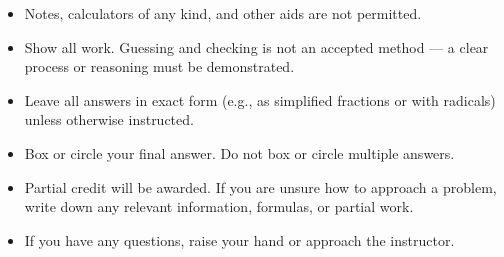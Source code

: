%

\begin{itemize}
	\item Notes, calculators of any kind, and other aids are not permitted.
	\item Show all work. Guessing and checking is not an accepted method --- a clear process or reasoning must be demonstrated.
	\item Leave all answers in exact form (e.g., as simplified fractions or with radicals) unless otherwise instructed.
	\item Box or circle your final answer. Do not box or circle multiple answers.
	\item Partial credit will be awarded. If you are unsure how to approach a problem, write down any relevant information, formulas, or partial work.
	\item If you have any questions, raise your hand or approach the instructor.
\end{itemize}
